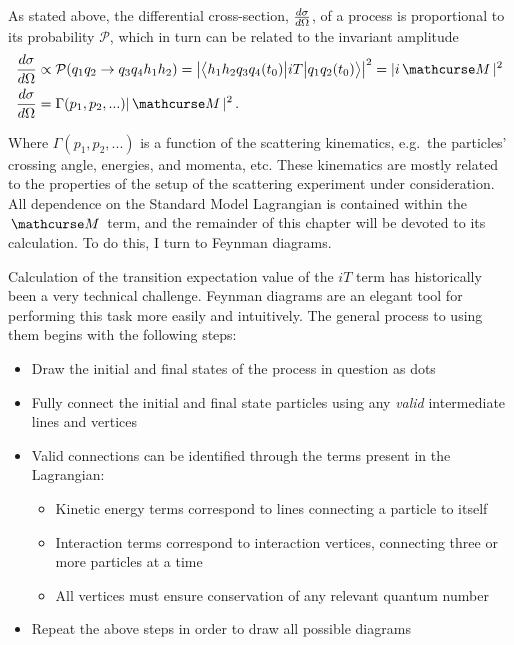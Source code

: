     As stated above, the differential cross-section, $\frac{d \sigma}{d \Omega}$,
        of a process is proportional to its probability $\mathcal{P}$,
        which in turn can be related to the invariant amplitude
    \begin{equation} \begin{split}
        \dXsec &\propto \mathcal{P}( q_{1} q_{2} \rightarrow q_{3} q_{4} h_1 h_2 ) 
            = \left| \TbraketA{ h_1 h_2 q_{3} q_{4} (t_0)}{iT}{q_{1} q_{2} (t_0)} \right|^2 
            = |i \invAmp|^2 
        \\\dXsec &= \Gamma(p_1, p_2, ...) |\invAmp|^2
        \,.
    \end{split} \end{equation}

    Where $\Gamma(p_1, p_2, ...)$ is a function of the scattering kinematics,
        e.g.\ the particles' crossing angle, energies, and momenta, etc.
    These kinematics are mostly related to the properties of the setup of the scattering experiment under consideration.
    All dependence on the Standard Model Lagrangian is contained within the $\invAmp$ term,
        and the remainder of this chapter will be devoted to its calculation.
    To do this, I turn to Feynman diagrams.

    Calculation of the transition expectation value of the $iT$ term has historically been a very technical challenge.
    Feynman diagrams are an elegant tool for performing this task more easily and intuitively.
    The general process to using them begins with the following steps:
    \begin{itemize}
        \item Draw the initial and final states of the process in question as dots
        \item Fully connect the initial and final state particles using any \textit{valid} intermediate lines and vertices
        \item Valid connections can be identified through the terms present in the Lagrangian:
        \begin{itemize}
            \item Kinetic energy terms correspond to lines connecting a particle to itself
            \item Interaction terms correspond to interaction vertices, connecting three or more particles at a time
            \item All vertices must ensure conservation of any relevant quantum number
        \end{itemize}
        \item Repeat the above steps in order to draw all possible diagrams
    \end{itemize}

